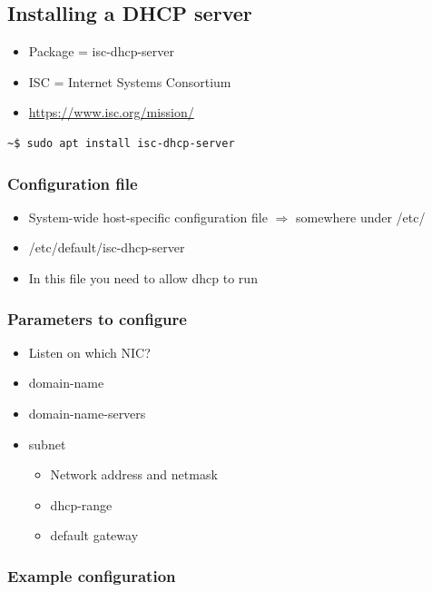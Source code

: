 \documentclass{article}
\begin{document}
\subsection{Installing a DHCP server}

\begin{itemize}
    \item Package = isc-dhcp-server
    \item ISC = Internet Systems Consortium 
    \item \url{https://www.isc.org/mission/}
\end{itemize}

\begin{verbatim}
~$ sudo apt install isc-dhcp-server
\end{verbatim}

\subsubsection{Configuration file}

\begin{itemize}
    \item System-wide host-specific configuration file $\Rightarrow$ somewhere under /etc/
    \item /etc/default/isc-dhcp-server
    \item In this file you need to allow dhcp to run
\end{itemize}

\subsubsection{Parameters to configure}

\begin{itemize}
    \item Listen on which NIC?
    \item domain-name
    \item domain-name-servers
    \item subnet
    \begin{itemize}
        \item Network address and netmask
        \item dhcp-range
        \item default gateway
    \end{itemize}
\end{itemize}

\subsubsection{Example configuration}
\end{document}
